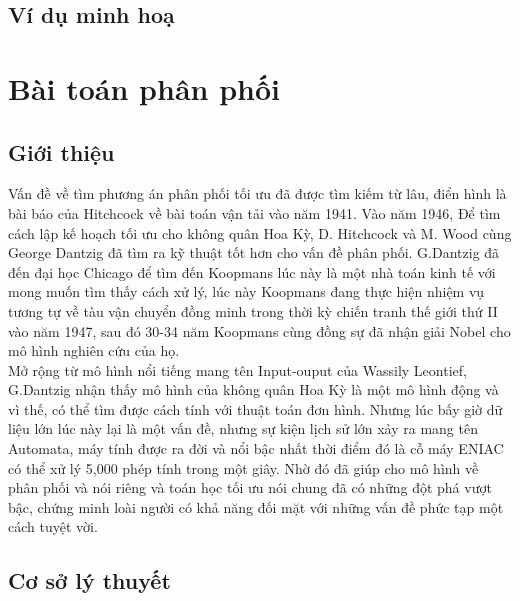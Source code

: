 \documentclass{article}
\begin{document}
    \subsection{Ví dụ minh hoạ}

\section{Bài toán phân phối}
    \subsection{Giới thiệu}
        Vấn đề về tìm phương án phân phối tối ưu đã được tìm kiếm từ lâu, điển hình là bài báo của Hitchcock về bài toán vận tải vào năm 1941. Vào năm 1946, Để tìm cách lập kế hoạch tối ưu cho không quân Hoa Kỳ, D. Hitchcock và M. Wood cùng George Dantzig đã tìm ra kỹ thuật tốt hơn cho vấn đề phân phối. G.Dantzig đã đến đại học Chicago để tìm đến Koopmans lúc này là một nhà toán kinh tế với mong muốn tìm thấy cách xử lý, lúc này Koopmans đang thực hiện nhiệm vụ tương tự về tàu vận chuyển đồng minh trong thời kỳ chiến tranh thế giới thứ II vào năm 1947, sau đó 30-34 năm Koopmans cùng đồng sự đã nhận giải Nobel cho mô hình nghiên cứu của họ. \\
        Mở rộng từ mô hình nổi tiếng mang tên Input-ouput của Wassily Leontief, G.Dantzig nhận thấy mô hình của không quân Hoa Kỳ là một mô hình động và vì thế, có thể tìm được cách tính với thuật toán đơn hình. Nhưng lúc bấy giờ dữ liệu lớn lúc này lại là một vấn đề, nhưng sự kiện lịch sử lớn xảy ra mang tên Automata, máy tính được ra đời và nổi bậc nhất thời điểm đó là cỗ máy ENIAC có thể xử lý 5,000 phép tính trong một giây. Nhờ đó đã giúp cho mô hình về phân phối và nói riêng và toán học tối ưu nói chung đã có những đột phá vượt bậc, chứng minh loài người có khả năng đối mặt với những vấn đề phức tạp một cách tuyệt vời.
    \subsection{Cơ sở lý thuyết}
\end{document}
